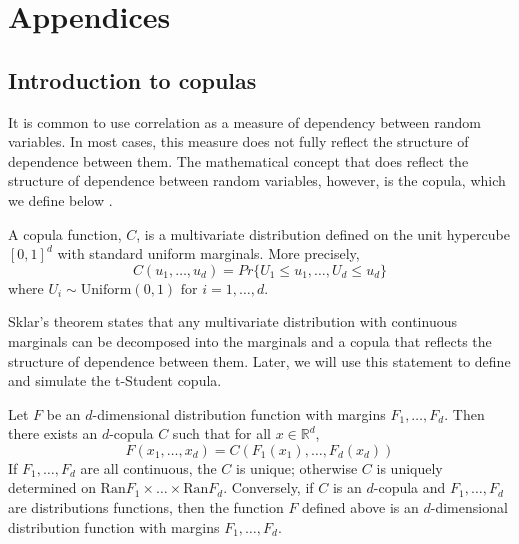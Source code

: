 \documentclass[11pt,fleqn]{book} %
\begin{document}
\chapter{Appendices}

\section{Introduction to copulas}

It is common to use correlation as a measure of dependency between random 
variables. In most cases, this measure does not fully reflect the structure 
of dependence between them. The mathematical concept that does reflect the 
structure of dependence between random variables, however, is the copula, 
which we define below \cite{McNeil:2005qf}.

\begin{definition}[Copula]
A copula function, $C$, is a multivariate distribution defined on the 
unit hypercube $[0,1]^d$ with standard uniform marginals. 
More precisely,
\begin{displaymath}
C(u_1, \dots, u_d) = Pr\{U_1 \le u_1, \dots, U_d \le u_d\}
\end{displaymath}
where $U_i \sim \textrm{Uniform}(0,1) \textrm{ for } i = 1,\dots, d$.
\end{definition}

Sklar's theorem \cite{sklar:1959} states that any multivariate 
distribution with continuous marginals can be decomposed into the marginals and 
a copula that reflects the structure of dependence between them. Later, we will 
use this statement to define and simulate the t-Student copula.

\begin{theorem}
Let $F$ be an $d$-dimensional distribution function with margins $F_1,\dots,F_d$.
Then there exists an $d$-copula $C$ such that for all $x \in \mathbb{R}^d$,
\begin{displaymath}
F(x_1,\dots,x_d) = C(F_1(x_1),\dots,F_d(x_d))
\end{displaymath}
If $F_1,\dots,F_d$ are all continuous, the $C$ is unique; otherwise $C$ is uniquely
determined on $\textrm{Ran}F_1 \times \dots \times \textrm{Ran}F_d$.
Conversely, if $C$ is an $d$-copula and $F_1,\dots,F_d$ are distributions functions,
then the function $F$ defined above is an $d$-dimensional distribution function
with margins $F_1,\dots,F_d$.
\end{theorem}
\end{document}
